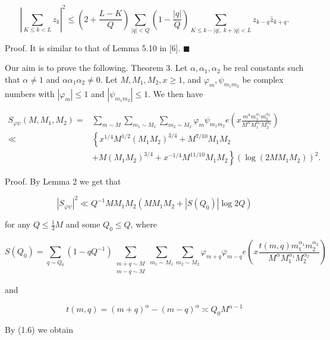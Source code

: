 \documentclass[10pt]{article}
\begin{document}
$$
\left|\sum_{K \leqslant k<L} z_{k}\right|^{2} \leqslant\left(2+\frac{L-K}{Q}\right) \sum_{|q|<Q}\left(1-\frac{|q|}{Q}\right) \sum_{K \leqslant k-|q|,\ k+|q|<L} z_{k-q} \bar{z}_{k+q} .
$$

Proof. It is similar to that of Lemma 5.10 in [6]. \(\blacksquare\)

Our aim is to prove the following.
Theorem 3. Let $\alpha, \alpha_{1}, \alpha_{2}$ be real constants such that $\alpha \neq 1$ and $\alpha \alpha_{1} \alpha_{2} \neq 0$. Let $M, M_{1}, M_{2}, x \geqslant 1$, and $\varphi_{m}, \psi_{m_{1} m_{2}}$ be complex numbers with $\left|\varphi_{m}\right| \leqslant 1$ and $\left|\psi_{m_{1} m_{2}}\right| \leqslant 1$. We then have

$$
\begin{aligned}
S_{\varphi \psi}\left(M, M_{1}, M_{2}\right)= & \sum_{m \sim M} \sum_{m_{1} \sim M_{1}} \sum_{m_{2} \sim M_{2}} \varphi_{m} \psi_{m_{1}m_{2}} e\left(x \frac{m^{\alpha} m_{1}^{\alpha_{1}} m_{2}^{\alpha_{2}}}{M^{\alpha} M_{1}^{\alpha_{1}} M_{2}^{\alpha_{2}}}\right) \\
\ll & \left\{x^{1 / 4} M^{1 / 2}\left(M_{1} M_{2}\right)^{3 / 4}+M^{7 / 10} M_{1} M_{2}\right. \\
& \left.+M\left(M_{1} M_{2}\right)^{3 / 4}+x^{-1 / 4} M^{11 / 10} M_{1} M_{2}\right\}\left(\log\left(2 M M_{1} M_{2}\right)\right)^{2} .
\end{aligned}
$$

Proof. By Lemma 2 we get that

$$
\left|S_{\varphi \psi}\right|^{2} \ll Q^{-1} M M_{1} M_{2}\left(M M_{1} M_{2}+\left|S\left(Q_{0}\right)\right| \log 2 Q\right)
$$

for any $Q \leqslant \frac{1}{3} M$ and some $Q_{0} \leqslant Q$, where

$$
S\left(Q_{0}\right)=\sum_{q \sim Q_{0}}\left(1-q Q^{-1}\right) \sum_{\substack{m+q\sim M\\m-q\sim M}} \sum_{m_{1}\sim M_{1}} \sum_{m_{2}\sim M_{2}} \varphi_{m+q} \overline{\varphi}_{m-q} e\left(x \frac{t(m, q) m_{1}^{\alpha_{1}} m_{2}^{\alpha_{2}}}{M^{\alpha} M_{1}^{\alpha_{1}} M_{2}^{\alpha_{2}}}\right)
$$

and

$$
t(m, q)=(m+q)^{\alpha}-(m-q)^{\alpha} \asymp Q_{0} M^{\alpha-1}
$$

By (1.6) we obtain
\end{document}
